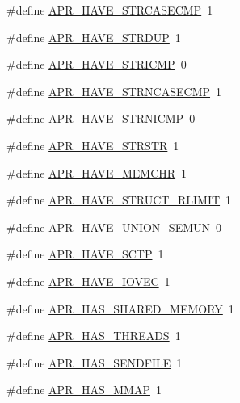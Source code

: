 \begin{DoxyCompactItemize}
\item 
\#define \hyperlink{group__apr__platform_ga4da5b6343c5b896efb3695c94f8dd374}{A\+P\+R\+\_\+\+H\+A\+V\+E\+\_\+\+S\+T\+R\+C\+A\+S\+E\+C\+MP}~1
\item 
\#define \hyperlink{group__apr__platform_ga73cf943f6399274e71979e902b3030a0}{A\+P\+R\+\_\+\+H\+A\+V\+E\+\_\+\+S\+T\+R\+D\+UP}~1
\item 
\#define \hyperlink{group__apr__platform_ga07a4215d05bb012f8ff9c4c681b2f9a3}{A\+P\+R\+\_\+\+H\+A\+V\+E\+\_\+\+S\+T\+R\+I\+C\+MP}~0
\item 
\#define \hyperlink{group__apr__platform_ga8f45d52206b5d6ee37dc05e53d9bd93c}{A\+P\+R\+\_\+\+H\+A\+V\+E\+\_\+\+S\+T\+R\+N\+C\+A\+S\+E\+C\+MP}~1
\item 
\#define \hyperlink{group__apr__platform_gadc5209ed6b80ac6734ce2a13a3a2273d}{A\+P\+R\+\_\+\+H\+A\+V\+E\+\_\+\+S\+T\+R\+N\+I\+C\+MP}~0
\item 
\#define \hyperlink{group__apr__platform_ga2850a7c280e08a629d2b0bc2eeb97b41}{A\+P\+R\+\_\+\+H\+A\+V\+E\+\_\+\+S\+T\+R\+S\+TR}~1
\item 
\#define \hyperlink{group__apr__platform_ga510e98c8dd8ef45a6c902b8daaedc3a4}{A\+P\+R\+\_\+\+H\+A\+V\+E\+\_\+\+M\+E\+M\+C\+HR}~1
\item 
\#define \hyperlink{group__apr__platform_ga2519340ecb3c313c81d36d70335430f9}{A\+P\+R\+\_\+\+H\+A\+V\+E\+\_\+\+S\+T\+R\+U\+C\+T\+\_\+\+R\+L\+I\+M\+IT}~1
\item 
\#define \hyperlink{group__apr__platform_ga40fd92f709fa181dee59734f4564ead1}{A\+P\+R\+\_\+\+H\+A\+V\+E\+\_\+\+U\+N\+I\+O\+N\+\_\+\+S\+E\+M\+UN}~0
\item 
\#define \hyperlink{group__apr__platform_ga06b60866b89f9881de1022d193a7f126}{A\+P\+R\+\_\+\+H\+A\+V\+E\+\_\+\+S\+C\+TP}~1
\item 
\#define \hyperlink{group__apr__platform_gafb25c8af133971c391c18193e67a5f4f}{A\+P\+R\+\_\+\+H\+A\+V\+E\+\_\+\+I\+O\+V\+EC}~1
\item 
\#define \hyperlink{group__apr__platform_ga88684cc5f8a23bc2cd6a4b63e5943e05}{A\+P\+R\+\_\+\+H\+A\+S\+\_\+\+S\+H\+A\+R\+E\+D\+\_\+\+M\+E\+M\+O\+RY}~1
\item 
\#define \hyperlink{group__apr__platform_ga8f98cbf61cd2ac1fada71fe486b04a34}{A\+P\+R\+\_\+\+H\+A\+S\+\_\+\+T\+H\+R\+E\+A\+DS}~1
\item 
\#define \hyperlink{group__apr__platform_ga653f9e26ef4064c7daaad1bb126b5d1f}{A\+P\+R\+\_\+\+H\+A\+S\+\_\+\+S\+E\+N\+D\+F\+I\+LE}~1
\item 
\#define \hyperlink{group__apr__platform_ga4f63ee64cebd015823f922c7ff98eadf}{A\+P\+R\+\_\+\+H\+A\+S\+\_\+\+M\+M\+AP}~1

\end{DoxyCompactItemize}
